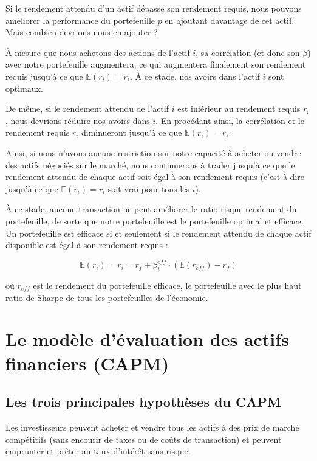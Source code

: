 \documentclass[a4paper, 12pt]{report}
\begin{document}
Si le rendement attendu d'un actif dépasse son rendement requis, nous pouvons améliorer la performance du portefeuille \( p \) en ajoutant davantage de cet actif. Mais combien devrions-nous en ajouter ?

À mesure que nous achetons des actions de l'actif \( i \), sa corrélation (et donc son \(\beta\)) avec notre portefeuille augmentera, ce qui augmentera finalement son rendement requis jusqu'à ce que \( \mathbb{E}(r_i) = r_i \). À ce stade, nos avoirs dans l'actif \( i \) sont optimaux. 

De même, si le rendement attendu de l'actif \( i \) est inférieur au rendement requis \( r_i \), nous devrions réduire nos avoirs dans \( i \). En procédant ainsi, la corrélation et le rendement requis \( r_i \) diminueront jusqu'à ce que \( \mathbb{E}(r_i) = r_i \).

Ainsi, si nous n'avons aucune restriction sur notre capacité à acheter ou vendre des actifs négociés sur le marché, nous continuerons à trader jusqu'à ce que le rendement attendu de chaque actif soit égal à son rendement requis (c'est-à-dire jusqu'à ce que \( \mathbb{E}(r_i) = r_i \) soit vrai pour tous les \( i \)).

À ce stade, aucune transaction ne peut améliorer le ratio risque-rendement du portefeuille, de sorte que notre portefeuille est le portefeuille optimal et efficace. Un portefeuille est efficace si et seulement si le rendement attendu de chaque actif disponible est égal à son rendement requis :

\[
\mathbb{E}(r_i) = r_i = r_f + \beta^{eff}_i \cdot (\mathbb{E}(r_{eff}) - r_f)
\]

où \( r_{eff} \) est le rendement du portefeuille efficace, le portefeuille avec le plus haut ratio de Sharpe de tous les portefeuilles de l'économie.

\section{Le modèle d'évaluation des actifs financiers (CAPM)}

\subsection{Les trois principales hypothèses du CAPM}

Les investisseurs peuvent acheter et vendre tous les actifs à des prix de marché compétitifs (sans encourir de taxes ou de coûts de transaction) et peuvent emprunter et prêter au taux d'intérêt sans risque.
\end{document}

